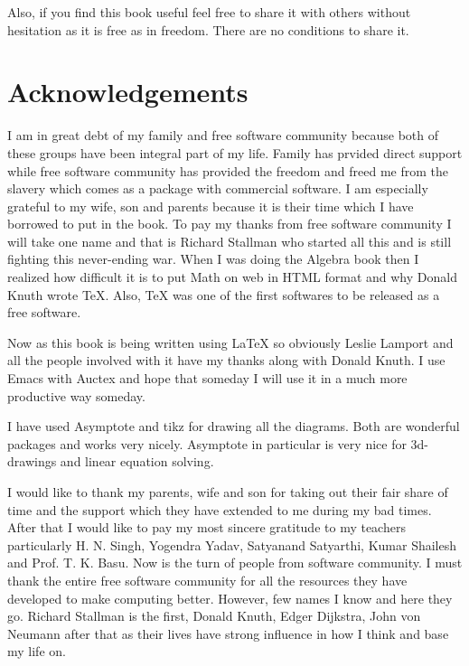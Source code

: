Also, if you find this book useful feel free to share it with others without hesitation as it is free as in freedom. There are no
conditions to share it.

\section*{Acknowledgements}
I am in great debt of my family and free software community because both of
these groups have been integral part of my life. Family has prvided direct
support while free software community has provided the freedom and freed me
from the slavery which comes as a package with commercial software. I am
especially grateful to my wife, son and parents because it is their time which
I have borrowed to put in the book. To pay my thanks from free software
community  I will take one name and that is Richard Stallman who started all
this  and is still fighting this never-ending war. When I was doing the Algebra
book then I realized how difficult it is to put Math on web in HTML format and
why Donald Knuth wrote \TeX{}. Also, \TeX{} was one of the first softwares to
be released as a free software.

Now as this book is being written using \LaTeX{} so obviously Leslie Lamport
and all the people involved with it have my thanks along with Donald Knuth. I
use Emacs with Auctex and hope that someday I will use it in a much more
productive way someday.

I have used Asymptote and tikz for drawing all the diagrams. Both are wonderful
packages and works very nicely. Asymptote in particular is very nice for 3d-drawings and linear equation solving.

I would like to thank my parents, wife and son for taking out their fair share
of time and the support which they have extended to me during my bad
times. After that I would like to pay my most sincere gratitude to my teachers
particularly H. N. Singh, Yogendra Yadav, Satyanand Satyarthi, Kumar Shailesh
and Prof. T. K. Basu. Now is the turn of people from software community. I must
thank the entire free software community for all the resources they have
developed to make computing better. However, few names I know and here they
go. Richard Stallman is the first, Donald Knuth, Edger Dijkstra, John von Neumann after that as their lives have strong influence in
how I think and base my life on.

